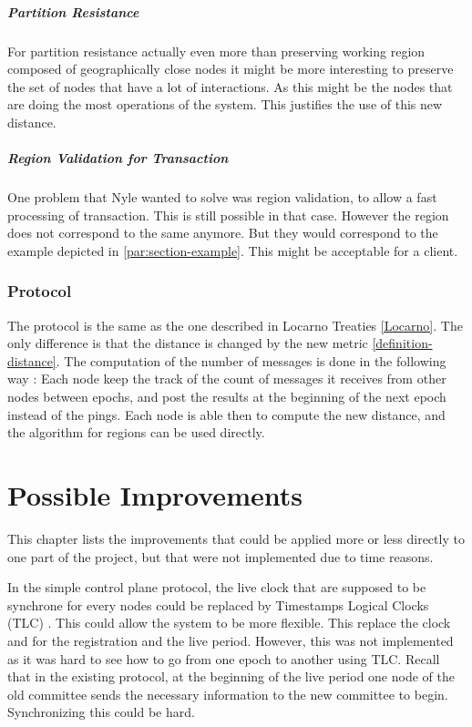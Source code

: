 \documentclass[a4paper,11pt,oneside]{report}
\begin{document}
\paragraph{Partition Resistance}
For partition resistance actually even more than preserving working region
composed of geographically close nodes it might be more interesting to preserve
the set of nodes that have a lot of interactions. As this might be the nodes
that are doing the most operations of the system. This justifies the use of
this new distance.

\paragraph{Region Validation for Transaction}
One problem that Nyle wanted to solve was region validation, to allow a fast
processing of transaction. This is still possible in that case. However the
region does not correspond to the same anymore. But they would correspond to
the example depicted in \autoref{par:section-example}. This might be acceptable
for a client. 

\subsection{Protocol}
The protocol is the same as the one described in Locarno Treaties
\autoref{Locarno}. The only difference is that the distance is changed by the
new metric \autoref{definition-distance}. The computation of the number of
messages is done in the following way : Each node keep the track of the count
of messages it receives from other nodes between epochs, and post the results
at the beginning of the next epoch instead of the pings. Each node is able then
to compute the new distance, and the algorithm for regions can be used
directly.

\chapter{Possible Improvements} \label{chap:Possible Improvements}

This chapter lists the improvements that could be applied more or less directly
to one part of the project, but that were not implemented due to time reasons. 

In the simple control plane protocol, the live clock that are supposed to be
synchrone for every nodes could be replaced by Timestamps Logical Clocks (TLC)
\cite{Ford2019}. This could allow the system to be more flexible.
This replace the clock and for the registration and the live period.
However, this was not implemented as it was hard to see how to go from one
epoch to another using TLC. Recall that in the existing protocol, at the
beginning of the live period one node of the old committee sends the necessary
information to the new committee to begin. Synchronizing this could be hard.
\end{document}

